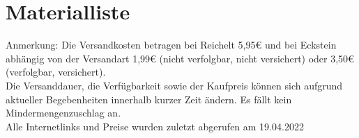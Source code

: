 \documentclass[12pt,a4paper,openany]{scrbook}
\begin{document}
	
	 
	\newpage
\chapter{Materialliste}
Anmerkung: Die Versandkosten betragen bei Reichelt 5,95€ und bei Eckstein abhängig von der Versandart 1,99€ (nicht verfolgbar, nicht versichert) oder 3,50€ (verfolgbar, versichert).\\ Die Versanddauer, die Verfügbarkeit sowie der Kaufpreis können sich aufgrund aktueller Begebenheiten innerhalb kurzer Zeit ändern. Es fällt kein Mindermengenzuschlag an.\\ 
Alle Internetlinks und Preise wurden zuletzt abgerufen am 19.04.2022

\vspace{1cm}
\centering
\end{document}
